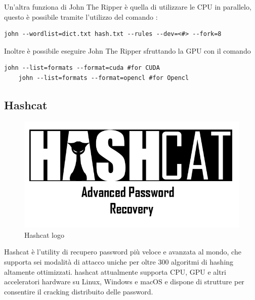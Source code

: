 Un'altra funziona di John The Ripper è quella di utilizzare le CPU in parallelo, questo è possibile tramite l'utilizzo del comando :

\begin{lstlisting}[caption={John the ripper Multi-CPU example 8 core}, style=javaScriptCode]
    john --wordlist=dict.txt hash.txt --rules --dev=<#> --fork=8
\end{lstlisting}

Inoltre è possibile eseguire John The Ripper sfruttando la GPU con il comando 
\begin{lstlisting}[caption={John the ripper GPU example}, style=javaScriptCode]
    john --list=formats --format=cuda #for CUDA
    john --list=formats --format=opencl #for Opencl\end{lstlisting}
\subsection{Hashcat}

\begin{figure}[htpb!]
    \centering
    \includegraphics[width=\linewidth]{Immagini/1/hashcat-logo.png}
    \caption{Hashcat logo}
\end{figure}

Hashcat \cite{hashcat} è l'utility di recupero password più veloce e avanzata al mondo, che supporta sei modalità di attacco uniche per oltre 300 algoritmi di hashing altamente ottimizzati. hashcat attualmente supporta CPU, GPU e altri acceleratori hardware su Linux, Windows e macOS e dispone di strutture per consentire il cracking distribuito delle password.

